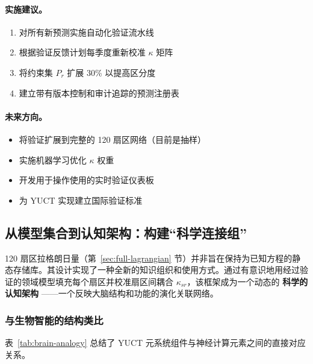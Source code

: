 \documentclass[11pt,a4paper]{article}
\begin{document}
	\paragraph{实施建议。}
	\begin{enumerate}[leftmargin=*]
		\item 对所有新预测实施自动化验证流水线
		\item 根据验证反馈计划每季度重新校准 $\kappa$ 矩阵
		\item 将约束集 $P_r$ 扩展 30\% 以提高区分度
		\item 建立带有版本控制和审计追踪的预测注册表
	\end{enumerate}
	
	\paragraph{未来方向。}
	\begin{itemize}
		\item 将验证扩展到完整的 120 扇区网络（目前是抽样）
		\item 实施机器学习优化 $\kappa$ 权重
		\item 开发用于操作使用的实时验证仪表板
		\item 为 YUCT 实现建立国际验证标准
	\end{itemize}
	
	\subsection{从模型集合到认知架构：构建“科学连接组”}
	\label{subsec:cognitive-architecture}
	
	120 扇区拉格朗日量（第~\ref{sec:full-lagrangian} 节）并非旨在保持为已知方程的静态存储库。其设计实现了一种全新的知识组织和使用方式。通过有意识地用经过验证的领域模型填充每个扇区并校准扇区间耦合 $\kappa_{sr}$，该框架成为一个动态的 \textbf{科学的认知架构} ——一个反映大脑结构和功能的演化关联网络。
	
	\subsubsection*{与生物智能的结构类比}
	表~\ref{tab:brain-analogy} 总结了 YUCT 元系统组件与神经计算元素之间的直接对应关系。
	
\end{document}

